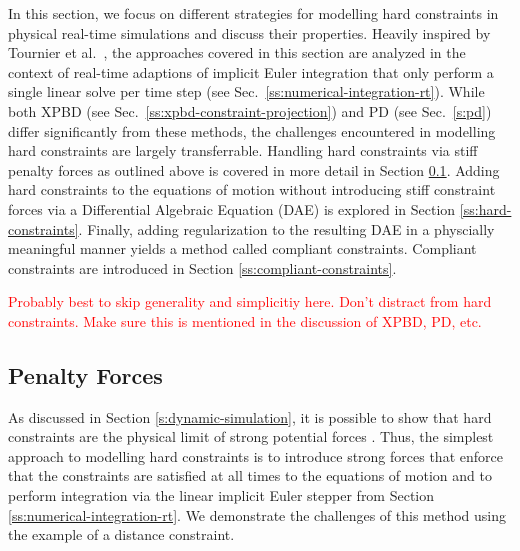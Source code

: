 In this section, we focus on different strategies for modelling hard constraints in physical real-time simulations and discuss 
their properties. Heavily inspired by Tournier et al.\ \cite{tournier2015}, the approaches covered in this section are analyzed 
in the context of real-time adaptions of implicit Euler integration that only perform a single linear solve per time step 
(see Sec.\ \ref{ss:numerical-integration-rt}). While both XPBD (see Sec.\ \ref{ss:xpbd-constraint-projection}) and PD (see Sec.\ \ref{s:pd}) differ significantly 
from these methods, the challenges encountered in modelling hard constraints are largely transferrable. Handling hard constraints 
via stiff penalty forces as outlined above is covered in more detail in Section \ref{ss:penalty-forces}. Adding hard constraints to the equations
of motion without introducing stiff constraint forces via a Differential Algebraic Equation (DAE) is explored in Section \ref{ss:hard-constraints}.
Finally, adding regularization to the resulting DAE in a physcially meaningful manner yields a method called compliant constraints. 
Compliant constraints are introduced in Section \ref{ss:compliant-constraints}.

\textcolor{red}{Probably best to skip generality and simplicitiy here. Don't distract from hard constraints. Make sure this is 
mentioned in the discussion of XPBD, PD, etc.}

\subsection{Penalty Forces}\label{ss:penalty-forces}
As discussed in Section \ref{s:dynamic-simulation}, it is possible to show that hard constraints are the physical limit of strong potential 
forces \cite{servin2006}. Thus, the simplest approach to modelling hard constraints is to introduce strong forces that enforce 
that the constraints are satisfied at all times to the equations of motion and to perform integration via the linear implicit Euler
stepper from Section \ref{ss:numerical-integration-rt}. We demonstrate the challenges of this method using the example of 
a distance constraint.

